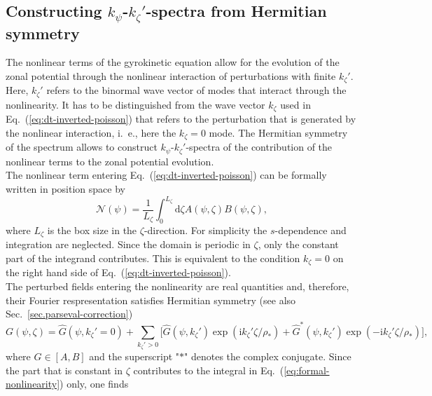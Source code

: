 \subsection{Constructing $k_\psi$-$k_\zeta'$-spectra from Hermitian symmetry}
\label{zevo-kxky-spectra}
The nonlinear terms of the gyrokinetic equation allow for the evolution of the zonal potential through the nonlinear interaction of perturbations with finite $k_\zeta'$.
Here, $k_\zeta'$ refers to the binormal wave vector of modes that interact through the nonlinearity.
It has to be distinguished from the wave vector $k_\zeta$ used in Eq.~(\ref{eq:dt-inverted-poisson}) that refers to the perturbation that is generated by the nonlinear interaction, i.~e., here the $k_\zeta = 0$ mode.
The Hermitian symmetry of the spectrum allows to construct $k_\psi$-$k_\zeta'$-spectra of the contribution of the nonlinear terms to the zonal potential evolution. \\
The nonlinear term entering Eq.~(\ref{eq:dt-inverted-poisson}) can be formally written in position space by
    \begin{equation}
    \mathcal{N}(\psi) = \frac{1}{L_\zeta} \int_0^{L_\zeta} \mathrm{d} \zeta A(\psi, \zeta) B(\psi,\zeta),
    \label{eq:formal-nonlinearity}
    \end{equation}
where $L_\zeta$ is the box size in the $\zeta$-direction.
For simplicity the $s$-dependence and integration are neglected.
Since the domain is periodic in $\zeta$, only the constant part of the integrand contributes.
This is equivalent to the condition $k_\zeta = 0$ on the right hand side of Eq.~(\ref{eq:dt-inverted-poisson}). \\
The perturbed fields entering the nonlinearity are real quantities and, therefore, their Fourier respresentation satisfies Hermitian symmetry (see also Sec.~\ref{sec.parseval-correction})
    \begin{equation}
    G(\psi, \zeta) = \hat G (\psi,k_\zeta'=0) + \sum_{k_\zeta' > 0} \biggl[ \hat G (\psi,k_\zeta') \exp(\mathrm{i} k_\zeta' \zeta/\rho_\ast) +  \hat G^\ast (\psi,k_\zeta') \exp(-\mathrm{i} k_\zeta' \zeta/\rho_\ast) \biggr],
    \label{eq:hermitian-spectrum}
    \end{equation}
where $G \in [A, B]$ and the superscript "$\ast$" denotes the complex conjugate.
Since the part that is constant in $\zeta$ contributes to the integral in Eq.~(\ref{eq:formal-nonlinearity}) only, one finds
